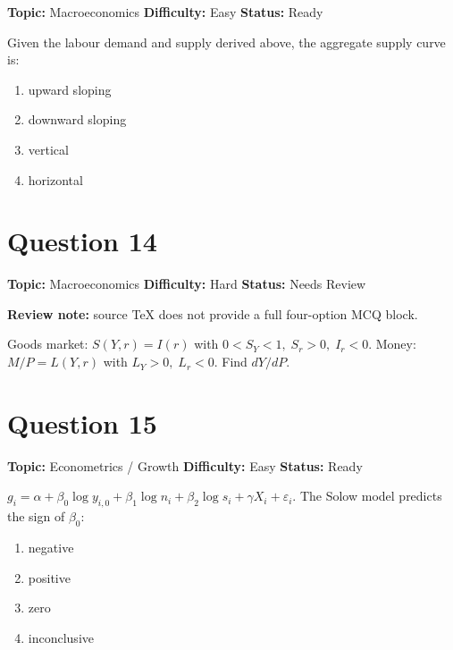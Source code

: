 \documentclass[11pt]{article}
\begin{document}

\noindent\textbf{Topic:} Macroeconomics \quad \textbf{Difficulty:} Easy \quad \textbf{Status:} Ready



Given the labour demand and supply derived above, the aggregate supply curve is:
\begin{enumerate}[label=(\Alph*)]
\item upward sloping \item downward sloping \item vertical \item horizontal
\end{enumerate}

\newpage

\section*{Question 14}


\noindent\textbf{Topic:} Macroeconomics \quad \textbf{Difficulty:} Hard \quad \textbf{Status:} Needs Review

\par\noindent\textcolor{StatAmber}{\textbf{Review note:} source TeX does not provide a full four-option MCQ block.}


Goods market: $S(Y,r)=I(r)$ with $0<S_Y<1,\;S_r>0,\;I_r<0$. Money: $M/P=L(Y,r)$ with $L_Y>0,\;L_r<0$. Find $dY/dP$.

\newpage

\section*{Question 15}


\noindent\textbf{Topic:} Econometrics / Growth \quad \textbf{Difficulty:} Easy \quad \textbf{Status:} Ready



$g_i=\alpha+\beta_0\log y_{i,0}+\beta_1\log n_i+\beta_2\log s_i+\gamma X_i+\varepsilon_i$. The Solow model predicts the sign of $\beta_0$:
\begin{enumerate}[label=(\Alph*)]
\item negative \item positive \item zero \item inconclusive
\end{enumerate}
\end{document}
